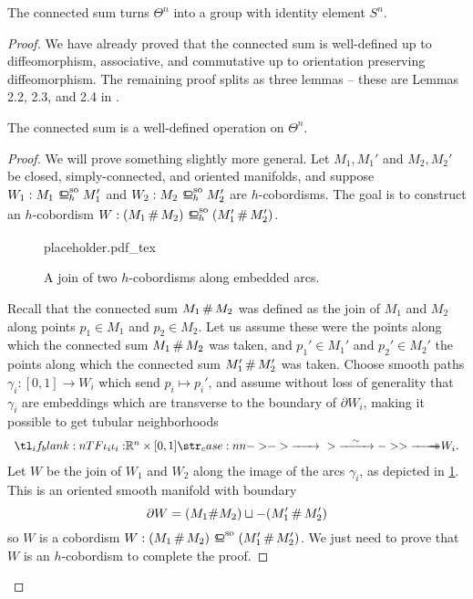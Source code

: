 \begin{theorem}\label{thm:group-of-homotopy-spheres}
	The connected sum turns $\Theta^n$ into a group with identity element $S^n$.
\end{theorem}
\begin{proof}
	We have already proved that the connected sum is well-defined up to diffeomorphism, associative, and commutative up to orientation preserving diffeomorphism.  
	The remaining proof splits as three lemmas -- these are Lemmas 2.2, 2.3, and 2.4 in \cite{milnorkervaire1963groups}.

	\begin{lemma}
		The connected sum is a well-defined operation on $\Theta^n$.
	\end{lemma}
	\begin{proof}
		We will prove something slightly more general. Let $M_1, M_1'$ and $M_2, M_2'$ be closed, simply-connected, and oriented manifolds, and suppose $W_1 : M_1\sohbord M_1'$ and $W_2 : M_2\sohbord M_2'$ are $h$-cobordisms. The goal is to construct an $h$-cobordism $W : (M_1\+M_2)\sohbord (M_1'\+M_2')$.

		\begin{figure}[ht]
			\centering
			{placeholder.pdf_tex}
			\caption{A join of two $h$-cobordisms along embedded arcs.}\label{fig:connected-sum-of-h-cobordisms}
		\end{figure}

		Recall that the connected sum $M_1\,\#\,M_2$ was defined as the join of $M_1$ and $M_2$ along points $p_1\in M_1$ and $p_2\in M_2$. Let us assume these were the points along which the connected sum $M_1\,\#\,M_2$ was taken, and $p_1'\in M_1'$ and $p_2'\in M_2'$ the points along which the connected sum $M_1'\,\#\,M_2'$ was taken. Choose smooth paths $\gamma_i : [0,1] \to W_i$ which send $p_i\mapsto p_i'$, and assume without loss of generality that $\gamma_i$ are embeddings which are transverse to the boundary of $\partial W_i$, making it possible to get tubular neighborhoods
		\[
			\lkxfunc{\iota_i}{\R^n\times [0,1]}{W_i.}
		\]
		Let $W$ be the join of $W_1$ and $W_2$ along the image of the arcs $\gamma_i$, as depicted in \cref{fig:connected-sum-of-h-cobordisms}. This is an oriented smooth manifold with boundary
		\[
			\partial W = (M_1\#M_2)\sqcup -(M_1'\,\#\,M_2')
		\]
		so $W$ is a cobordism $W : (M_1\+M_2)\sobord (M_1'\+M_2')$. We just need to prove that $W$ is an $h$-cobordism to complete the proof.


\end{proof}
\end{proof}
